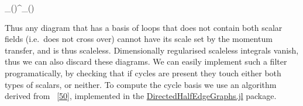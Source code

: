 \documentclass[
  10pt,
  a4paper,
  DIV=11,
  numbers=noendperiod,
  twoside]{scrreprt}
\let\[\relax \let\]\relax %
\DeclareRobustCommand{\[}{\begin{equation}}
\DeclareRobustCommand{\]}{\end{equation}}
\begin{document}
\[
_()\lambda^\eta {}_()
\]

Thus any diagram that has a basis of loops that does not contain both
scalar fields (i.e.~does not cross over) cannot have its scale set by
the momentum transfer, and is thus scaleless. Dimensionally regularised
scaleless integrals vanish, thus we can also discard these diagrams. We
can easily implement such a filter programatically, by checking that if
cycles are present they touch either both types of scalars, or neither.
To compute the cycle basis we use an algorithm derived from
~{[}\protect\hyperlink{ref-Paton:1969}{50}{]}, implemented in the
\href{https://github.com/lcnhb/DirectedHalfEdgeGraphs.jl}{DirectedHalfEdgeGraphs.jl}
package.
\end{document}
